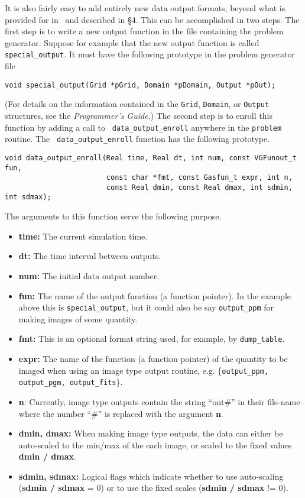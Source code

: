 It is also fairly easy to add entirely new data output formats, beyond what
is provided for in \ath\ and described in \S4.
This can be accomplished in two steps.
The first step is to write a new output function in the file
containing the problem generator.  Suppose for example that the new
output function is called {\tt special\_output}.  It must have the
following prototype in the problem generator file
\begin{verbatim}
void special_output(Grid *pGrid, Domain *pDomain, Output *pOut);
\end{verbatim}
(For details on the information contained in the {\tt Grid}, {\tt Domain},
or {\tt Output} structures, see the {\it Programmer's Guide}.)  The second step
is to enroll this function by adding a call to {\tt
data\_output\_enroll} anywhere in the {\tt problem} routine.  The {\tt
data\_output\_enroll} function has the following prototype.
\begin{verbatim}
void data_output_enroll(Real time, Real dt, int num, const VGFunout_t fun,
                        const char *fmt, const Gasfun_t expr, int n,
                        const Real dmin, const Real dmax, int sdmin, int sdmax);
\end{verbatim}
The arguments to this function serve the following purpose.
\begin{itemize}

\item {\bf time:} The current simulation time.

\item {\bf dt:} The time interval between outputs.

\item {\bf num:} The initial data output number.

\item {\bf fun:} The name of the output function (a function pointer).  In
  the example above this is {\tt special\_output}, but it could also
  be say {\tt output\_ppm} for making images of some quantity.

\item {\bf fmt:} This is an optional format string used, for example,
  by {\tt dump\_table}.

\item {\bf expr:} The name of the function (a function pointer) of the
  quantity to be imaged when using an image type output routine,
  e.g. \{{\tt output\_ppm, output\_pgm, output\_fits}\}.

\item {\bf n}: Currently, image type outputs contain the string ``out\#'' 
in their file-name where the number ``\#'' is replaced with the argument 
{\bf n}.

\item {\bf dmin, dmax:} When making image type outputs, the data can 
either be auto-scaled to the min/max of the each image, or scaled to
the fixed values {\bf dmin / dmax}.

\item {\bf sdmin, sdmax:} Logical flags which indicate whether to use
auto-scaling ({\bf sdmin / sdmax} = 0) or to use the fixed scales
({\bf sdmin / sdmax} != 0).

\end{itemize}

